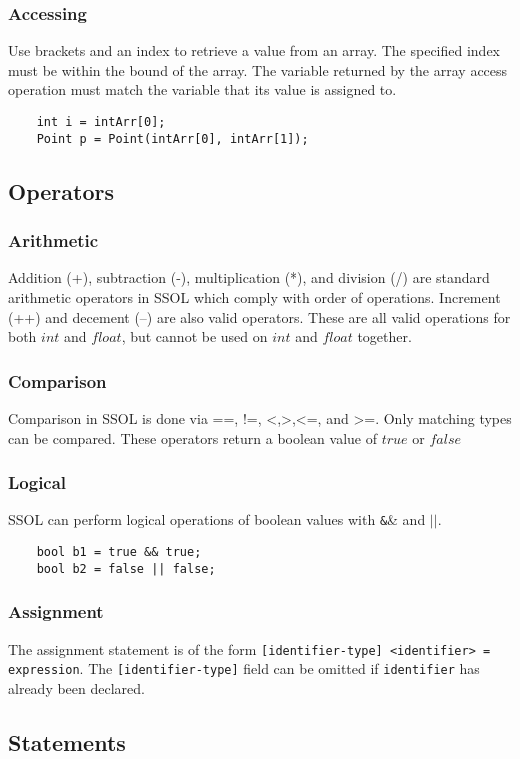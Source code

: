 \documentclass{article}
\begin{document}
\subsubsection{Accessing}
Use brackets and an index to retrieve a value from an array. The specified index must be within the bound of the array. The variable returned by the array access operation must match the variable that its value is assigned to.
\begin{verbatim}
    int i = intArr[0];
    Point p = Point(intArr[0], intArr[1]);
\end{verbatim}
\subsection{Operators}
\subsubsection{Arithmetic}
Addition (+), subtraction (-), multiplication (*), and division (/) are standard arithmetic operators in SSOL which comply with order of operations. Increment (++) and decement (--) are also valid operators. These are all valid operations for both $int$ and $float$, but cannot be used on $int$ and $float$ together.
\subsubsection{Comparison}
Comparison in SSOL is done via ==, !=, \textless ,\textgreater,\textless=, and \textgreater=. Only matching types can be compared. These operators return a boolean value of $true$ or $false$

\subsubsection{Logical}
SSOL can perform logical operations of boolean values with \texttt\&\& and $||$.
\begin{verbatim}
    bool b1 = true && true;
    bool b2 = false || false;
\end{verbatim}

\subsubsection{Assignment}
The assignment statement is of the form \texttt{[identifier-type] <identifier> = expression}. The \texttt{[identifier-type]} field can be omitted if \texttt{identifier} has already been declared.

\subsection{Statements}
\end{document}
